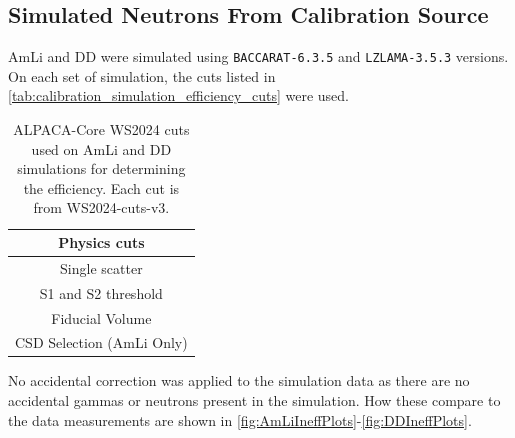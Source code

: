 \subsection{Simulated Neutrons From Calibration Source}
AmLi and DD were simulated using \lstinline{BACCARAT-6.3.5} and \lstinline{LZLAMA-3.5.3} versions.
On each set of simulation, the cuts listed in \autoref{tab:calibration_simulation_efficiency_cuts} were used.
\begin{table}
	\centering
	\begin{tabular}{c}
		Physics cuts              \\
		\hline
		Single scatter            \\
		S1 and S2 threshold       \\
		Fiducial Volume           \\
		CSD Selection (AmLi Only) \\
	\end{tabular}
	\caption{ALPACA-Core WS2024 cuts used on AmLi and DD simulations for determining the efficiency. Each cut is from WS2024-cuts-v3.}
	\label{tab:calibration_simulation_efficiency_cuts}
\end{table}
No accidental correction was applied to the simulation data as there are no accidental gammas or neutrons present in the simulation.
How these compare to the data measurements are shown in \autoref{fig:AmLiIneffPlots}-\ref{fig:DDIneffPlots}.
